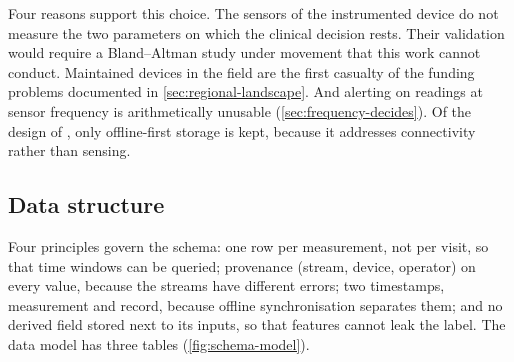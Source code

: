Four reasons support this choice. The sensors of the instrumented device do not measure the two parameters on which the clinical decision rests. Their validation would require a Bland--Altman study under movement that this work cannot conduct. Maintained devices in the field are the first casualty of the funding problems documented in \cref{sec:regional-landscape}. And alerting on readings at sensor frequency is arithmetically unusable (\cref{sec:frequency-decides}). Of the design of \textcite{efendi2025}, only offline-first storage is kept, because it addresses connectivity rather than sensing.

\subsection{Data structure}\label{sec:record-schema}\label{sec:adjudication}

Four principles govern the schema: one row per measurement, not per visit, so that time windows can be queried; provenance (stream, device, operator) on every value, because the streams have different errors; two timestamps, measurement and record, because offline synchronisation separates them; and no derived field stored next to its inputs, so that features cannot leak the label. The data model has three tables (\cref{fig:schema-model}).


